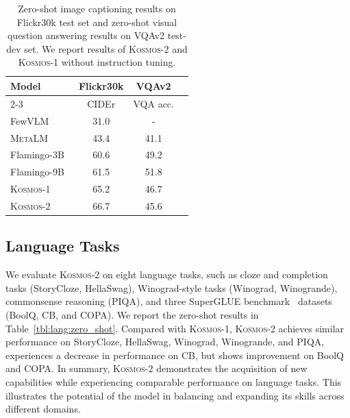 \documentclass{article}
\newcommand\kosmos{\textsc{Kosmos-1}}
\newcommand\our{\textsc{Kosmos-2}}
\begin{document}
\begin{table}[ht]
\centering
\begin{tabular}{lccc}
\toprule
\multirow{2}{*}{\textbf{Model}} & \textbf{Flickr30k} & \textbf{VQAv2} \\ \cmidrule(l){2-3} 
 & CIDEr & VQA acc. \\ \midrule
FewVLM~\cite{fewvlm} & 31.0 & - \\
\textsc{MetaLM}~\cite{metalm} & 43.4 & 41.1 \\
Flamingo-3B~\cite{flamingo} & 60.6 & 49.2 \\
Flamingo-9B~\cite{flamingo} & 61.5 & 51.8 \\
\kosmos{}      & 65.2 & 46.7 \\
\our{} & 66.7 & 45.6 \\
\bottomrule
\end{tabular}
\vspace{0.2cm}
\caption{Zero-shot image captioning results on Flickr30k test set and zero-shot visual question answering results on VQAv2 test-dev set.
We report results of \our{} and \kosmos{} without instruction tuning. 
}
\label{tbl:vl:zs-caption-vqa}
\end{table}


\subsection{Language Tasks}
\label{sec:eval:language}


We evaluate \our{} on eight language tasks, such as cloze and completion tasks (StoryCloze, HellaSwag), Winograd-style tasks (Winograd, Winogrande), commonsense reasoning (PIQA), and three SuperGLUE benchmark~\cite{superglue} datasets (BoolQ, CB, and COPA). 
We report the zero-shot results in Table~\ref{tbl:lang:zero_shot}.
Compared with \kosmos{}, \our{} achieves similar performance on StoryCloze, HellaSwag, Winograd, Winogrande, and PIQA, experiences a decrease in performance on CB, but shows improvement on BoolQ and COPA.
In summary, \our{} demonstrates the acquisition of new capabilities while experiencing comparable performance on language tasks. This illustrates the potential of the model in balancing and expanding its skills across different domains.
\end{document}
